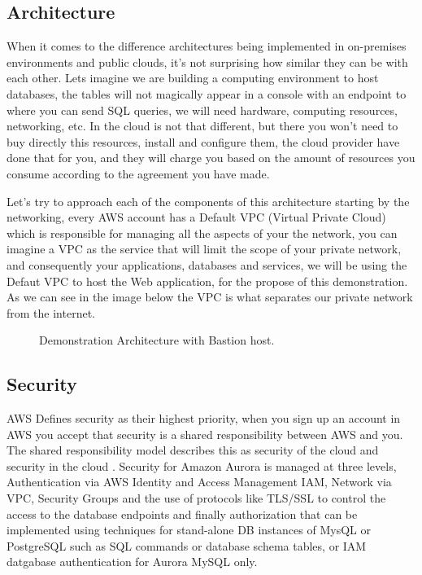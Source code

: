 \documentclass{article}
\begin{document}
\subsection{Architecture}
When it comes to the difference architectures being implemented in on-premises environments and public clouds, it's not surprising how similar they can be with each other. Lets imagine we are building a computing environment to host databases, the tables will not magically appear in a console with an endpoint to where you can send SQL queries, we will need hardware, computing resources, networking, etc. In the cloud is not that different, but there you won't need to buy directly this resources, install and configure them, the cloud provider have done that for you, and they will charge you based on the amount of resources you consume according to the agreement you have made. 

Let's try to approach each of the components of this architecture starting by the networking, every AWS account has a Default VPC (Virtual Private Cloud) which is responsible for managing all the aspects of your the network, you can imagine a VPC as the service that will limit the scope of your private network, and consequently your applications, databases and services, we will be using the Defaut VPC to host the Web application, for the propose of this demonstration. As we can see in the image below the VPC is what separates our private network from the internet. 

\begin{figure}[hbt!]
\centering
\caption{\label{fig:Arqchitecture} Demonstration Architecture with Bastion host.}
\end{figure}


\subsection{Security}

AWS Defines security as their highest priority, when you sign up an account in AWS you accept that security is a shared responsibility between AWS and you. The shared responsibility model describes this as security of the cloud and security in the cloud \cite{awsSecurityModel}. Security for Amazon Aurora is managed at three levels, Authentication via AWS Identity and Access Management IAM, Network via VPC, Security Groups and the use of protocols like TLS/SSL to control the access to the database endpoints and finally authorization that can be implemented using techniques for stand-alone DB instances of MysQL or PostgreSQL such as SQL commands or database schema tables, or IAM datgabase authentication for Aurora MySQL only. 
\end{document}
